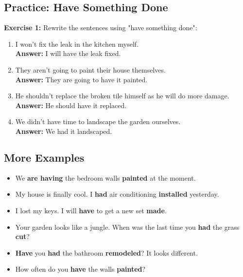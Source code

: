 \subsection{Practice: Have Something Done}

\textbf{Exercise 1:} Rewrite the sentences using "have something done":

\begin{enumerate}
    \item I won't fix the leak in the kitchen myself. \\
    \textbf{Answer:} I will have the leak fixed.
    
    \item They aren't going to paint their house themselves. \\
    \textbf{Answer:} They are going to have it painted.
    
    \item He shouldn't replace the broken tile himself as he will do more damage. \\
    \textbf{Answer:} He should have it replaced.
    
    \item We didn't have time to landscape the garden ourselves. \\
    \textbf{Answer:} We had it landscaped.
\end{enumerate}

\subsection{More Examples}

\begin{tcolorbox}[colback=blue!5, colframe=blue!30, title=Have Something Done Examples]
\begin{itemize}
    \item We \textbf{are having} the bedroom walls \textbf{painted} at the moment.
    \item My house is finally cool. I \textbf{had} air conditioning \textbf{installed} yesterday.
    \item I lost my keys. I will \textbf{have} to get a new set \textbf{made}.
    \item Your garden looks like a jungle. When was the last time you \textbf{had} the grass \textbf{cut}?
    \item \textbf{Have} you \textbf{had} the bathroom \textbf{remodeled}? It looks different.
    \item How often do you \textbf{have} the walls \textbf{painted}?
\end{itemize}
\end{tcolorbox}


